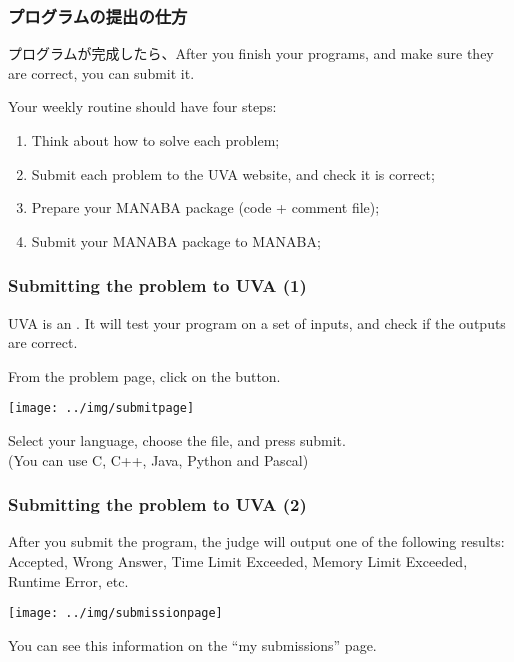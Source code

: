 \documentclass{beamer}
\begin{document}
\begin{frame}
  \frametitle{プログラムの提出の仕方} 
  
  プログラムが完成したら、After you finish your programs, \alert{and make sure they are
    correct}, you can submit it.

  \bigskip

  Your weekly routine should have four steps:
  \begin{enumerate}
    \item Think about how to solve each problem;
    \item Submit each problem to the UVA website, and check it is correct;
    \item Prepare your MANABA package (code + comment file);
    \item Submit your MANABA package to MANABA;
  \end{enumerate}
\end{frame}

\begin{frame}
  \frametitle{Submitting the problem to UVA (1)}

  {\small
  UVA is an . It will test your
  program on a set of inputs, and check if the outputs are correct.

  From the problem page, click on the  button. 
  
  \begin{center}
    \texttt{[image: ../img/submitpage]}
  \end{center}
  
  Select your language, choose the file, and press submit.\\
  (You can use C, C++, Java, Python {\tiny and Pascal})}
\end{frame}

\begin{frame}
  \frametitle{Submitting the problem to UVA (2)}

  {\small
    After you submit the program, the judge will output one of the
    following results: Accepted, Wrong Answer, Time Limit Exceeded,
    Memory Limit Exceeded, Runtime Error, etc.
    
    \begin{center}
      \texttt{[image: ../img/submissionpage]}
    \end{center}

    You can see this information on the ``my submissions'' page.
  }
\end{frame}
\end{document}

